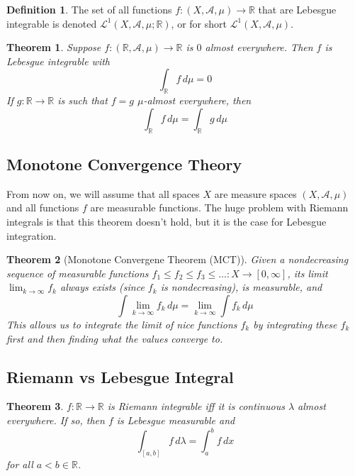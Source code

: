\documentclass{article}
\newtheorem{theorem}{Theorem}[section]
\theoremstyle{remark}
\theoremstyle{definition}
\newtheorem{definition}{Definition}[section]
\begin{document}
\begin{definition}
The set of all functions $f: (X, \mathcal{A}, \mu) \longrightarrow \mathbb{R}$ that are Lebesgue integrable is denoted $\mathcal{L}^1(X, \mathcal{A}, \mu; \mathbb{R})$, or for short $\mathcal{L}^1(X, \mathcal{A}, \mu)$. 
\end{definition}

\begin{theorem}
Suppose $f: (\mathbb{R}, \mathcal{A}, \mu) \longrightarrow \mathbb{R}$ is $0$ almost everywhere. Then $f$ is Lebesgue integrable with 
\[\int_\mathbb{R} f \, d\mu = 0 \]
If $g: \mathbb{R} \longrightarrow \mathbb{R}$ is such that $f = g$ $\mu$-almost everywhere, then
\[\int_\mathbb{R} f\, d\mu = \int_\mathbb{R} g \, d\mu\]
\end{theorem}

\subsection{Monotone Convergence Theory}

From now on, we will assume that all spaces $X$ are measure spaces $(X, \mathcal{A}, \mu)$ and all functions $f$ are measurable functions. The huge problem with Riemann integrals is that this theorem doesn't hold, but it is the case for Lebesgue integration. 

\begin{theorem}[Monotone Convergene Theorem (MCT)]
Given a nondecreasing sequence of measurable functions $f_1 \leq f_2 \leq f_3 \leq \ldots : X \longrightarrow [0, \infty]$, its limit $\lim_{k \rightarrow \infty} f_k$ always exists (since $f_k$ is nondecreasing), is measurable, and 
\[\int \lim_{k \rightarrow \infty} f_k \, d\mu = \lim_{k \rightarrow \infty} \int f_k \, d\mu\]
This allows us to integrate the limit of nice functions $f_k$ by integrating these $f_k$ first and then finding what the values converge to. 
\end{theorem}

\subsection{Riemann vs Lebesgue Integral}

\begin{theorem}
$f: \mathbb{R} \longrightarrow \mathbb{R}$ is Riemann integrable iff it is continuous $\lambda$ almost everywhere. If so, then $f$ is Lebesgue measurable and 
\[\int_{[a, b]} f \,d\lambda = \int_a^b f \, dx\]
for all $a < b \in \mathbb{R}$. 
\end{theorem}
\end{document}
